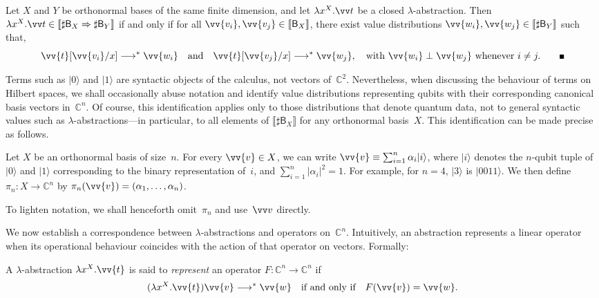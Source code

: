 \documentclass[runningheads,orivec,envcountsame,envcountsect]{llncs}
\providecommand{\qed}{\hbox{\rule{1ex}{1ex}}}%
\newcommand\ket[1]{\ensuremath{|#1\rangle}}
\newcommand\lra{\longrightarrow}
\def\C{\mathbb{C}}            %
\def\Lam#1#2#3{\lambda#1^{#2}{.}#3} %
\def\eval{\lra^*}
\def\Arr{\Rightarrow}
\def\sem#1{\llbracket#1\rrbracket}
\newcommand\basis[1]{\ensuremath{\mathsf{B}_{#1}}}
\begin{document}
\begin{lemma}\label{lem:BasesIso}
  Let $X$ and $Y$ be orthonormal bases of the same finite
  dimension, and let $\Lam{x}{X}{\vv t}$ be a closed $\lambda$-abstraction.
  Then $\Lam{x}{X}{\vv t}\in\sem{\sharp\basis{X}\Arr\sharp\basis{Y}}$
  if and only if 
  for all $\vv{v_i},\vv{v_j}\in\sem{\basis{X}}$,
  there exist value distributions
  $\vv{w_i},\vv{w_j}\in\sem{\sharp\basis{Y}}$ such that,
  \[
    \vv{t}[\vv{v_i}/x]\eval\vv{w_i}
    \quad\text{and}\quad
    \vv{t}[\vv{v_j}/x]\eval\vv{w_j},
    \quad\text{with } 
    \vv{w_i}\perp\vv{w_j}\text{ whenever }i\neq j.
    \tag*{\qed}
  \]
\end{lemma}

Terms such as $\ket{0}$ and $\ket{1}$ are syntactic objects of the
calculus, not vectors of~$\C^2$. Nevertheless, when discussing the behaviour of
terms on Hilbert spaces, we shall occasionally abuse notation and identify
value distributions representing qubits with their corresponding canonical
basis vectors in~$\C^n$. Of course, this identification applies only to those
distributions that denote quantum data, not to general syntactic values such as
$\lambda$-abstractions---in particular, to all elements of
$\sem{\sharp\basis{X}}$ for any orthonormal basis~$X$. This identification can
be made precise as follows.

\begin{definition}
  Let $X$ be an orthonormal basis of size~$n$. For every $\vv{v}\in X$, we can
  write
  \(
    \vv{v}\equiv \sum_{i=1}^{n}\alpha_i\ket{i}
  \),
  where $\ket{i}$ denotes the $n$-qubit tuple of $\ket{0}$ and $\ket{1}$
  corresponding to the binary representation of~$i$, and
  $\sum_{i=1}^{n}|\alpha_i|^2=1$. For example, for $n=4$, $\ket{3}$ is
  $\ket{0011}$. We then define $\pi_n:X\to\C^n$ by
  \(
    \pi_n(\vv{v}) = (\alpha_1,\dotsc,\alpha_n)
  \).
\end{definition}

To lighten notation, we shall henceforth omit~$\pi_n$ and use~$\vv v$
directly.

We now establish a correspondence between $\lambda$-abstractions and operators
on~$\C^n$. Intuitively, an abstraction represents a linear operator when its
operational behaviour coincides with the action of that operator on vectors.
Formally:

\begin{definition}
  A $\lambda$-abstraction $\Lam{x}{X}{\vv{t}}$ is said to \emph{represent}
  an operator $F:\C^n\to\C^n$ if
  \[
    (\Lam{x}{X}{\vv{t}})\vv{v} \eval \vv{w}
    \quad\text{if and only if}\quad
    F(\vv{v}) = \vv{w}.
  \]
\end{definition}
\end{document}
